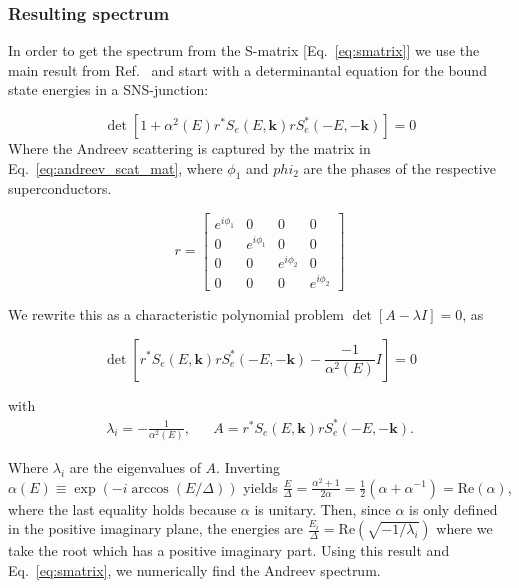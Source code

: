 		\subsubsection{Resulting spectrum}
			In order to get the spectrum from the S-matrix [Eq.~\eqref{eq:smatrix}] we use the main result from Ref.~\cite{beenakker1991universal} and start with a determinantal equation for the bound state energies in a SNS-junction:

			\begin{equation}
			\det\left[1+\alpha^{2}\left(E\right)r^{*}S_{e}\left(E,\bm{k}\right)rS_{e}^{*}\left(-E,-\bm{k}\right)\right]=0
			\label{eq:bound_state_condition_sjl}
			\end{equation}
			Where the Andreev scattering is captured by the matrix in Eq.~\ref{eq:andreev_scat_mat}, where $\phi_1$ and $phi_2$ are the phases of the respective superconductors.

			\begin{equation}
				r = \left[\begin{array}{llll}
		    		e^{i \phi_1}&0&0&0\\
		    		0&e^{i \phi_1}&0&0\\
		    		0&0&e^{i \phi_2}&0\\
		    		0&0&0&e^{i \phi_2}
		    		\end{array}\right]
				\label{eq:andreev_scat_mat}
			\end{equation}

			We rewrite this as a characteristic polynomial problem $\det\left[A-\lambda I\right]=0$, as

			\begin{equation}
			\det\left[r^{*}S_{e}\left(E,\bm{k}\right)rS_{e}^{*}\left(-E,-\bm{k}\right)-\frac{-1}{\alpha^{2}\left(E\right)}I\right]=0
			\end{equation}

			with
			\begin{align}
			\lambda_i=-\frac{1}{\alpha^{2}\left(E\right)},&&A=r^{*}S_{e}\left(E,\bm{k}\right)rS_{e}^{*}\left(-E,-\bm{k}\right).
			\end{align}

			Where $\lambda_i$ are the eigenvalues of $A$.
			Inverting $\alpha\left(E\right)\equiv\exp\left(-i\arccos\left(E/\Delta\right)\right)$ yields $\frac{E}{\Delta}=\frac{\alpha^{2}+1}{2\alpha}=\frac{1}{2}\left(\alpha+\alpha^{-1}\right)=\textrm{Re}(\alpha)$, where the last equality holds because $\alpha$ is unitary.
			Then, since $\alpha$ is only defined in the positive imaginary plane, the energies are $\frac{E_{i}}{\Delta}=\textrm{Re}\left(\sqrt{-1/\lambda_{i}}\right)$ where we take the root which has a positive imaginary part.
			Using this result and Eq.~\eqref{eq:smatrix}, we numerically find the Andreev spectrum.

